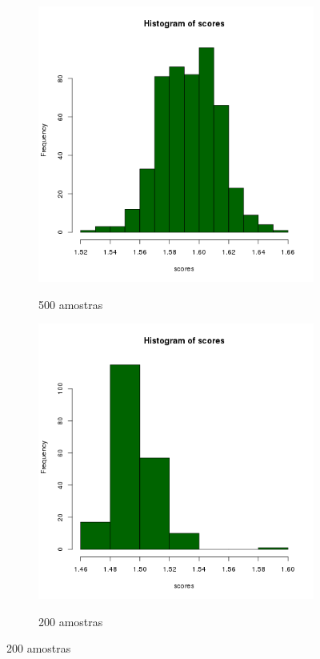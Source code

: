 \documentclass[11pt,a4paper]{article}
\begin{document}
\begin{figure}[H]
    \caption{Histogramas - Nexus 7, Android 4.4 Chrome}
    \label{nexus44histogramas}
    \begin{subfigure}{.5\textwidth}
        \caption{500 amostras}
        \centering
        \includegraphics[width=\textwidth]{images/hist-freq-n7-a44-chrome-500-amostras-20131119}
        \label{nexus44histograma500}
    \end{subfigure}
    \begin{subfigure}{.5\textwidth}
        \caption{200 amostras}
        \centering
        \includegraphics[width=\textwidth]{images/hist-freq-n7-a44-chrome-200-amostras-20131120}
        \label{nexus44histograma200}
    \end{subfigure}
\end{figure}
\end{document}
